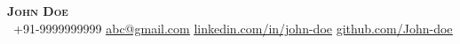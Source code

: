 \begin{center}
    \textbf{\Huge \scshape John Doe} \\ \vspace{1pt}
     \ \small +91-9999999999 \quad
    \href{mailto:abc@gmail.com}{ \underline{abc@gmail.com}} \quad
    \href{https://www.linkedin.com/in/john-doe}{ \underline{linkedin.com/in/john-doe}} \quad
    \href{https://github.com/John-doe}{ \underline{github.com/John-doe}}
\end{center}